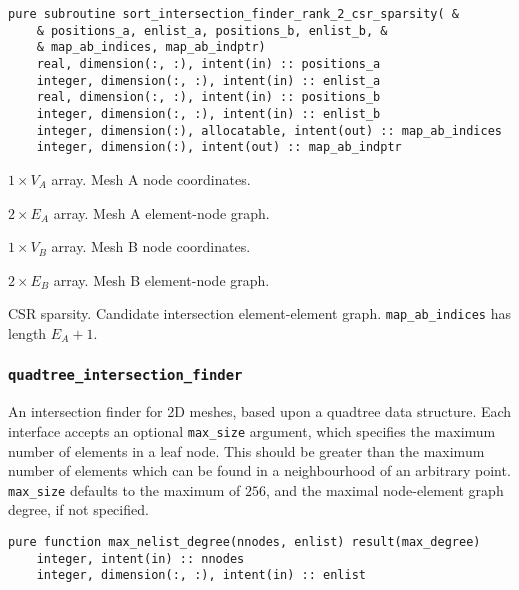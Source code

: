 \documentclass{article}
\begin{document}
\begin{lstlisting}[language=FORTRAN]
  pure subroutine sort_intersection_finder_rank_2_csr_sparsity( &
    & positions_a, enlist_a, positions_b, enlist_b, &
    & map_ab_indices, map_ab_indptr)
    real, dimension(:, :), intent(in) :: positions_a
    integer, dimension(:, :), intent(in) :: enlist_a
    real, dimension(:, :), intent(in) :: positions_b
    integer, dimension(:, :), intent(in) :: enlist_b
    integer, dimension(:), allocatable, intent(out) :: map_ab_indices
    integer, dimension(:), intent(out) :: map_ab_indptr
\end{lstlisting}

\begin{description}[font=\ttfamily\bfseries,leftmargin=2.2\parindent,labelindent=1.7\parindent,noitemsep]
  \item[positions\_a] $1 \times V_A$ array. Mesh A node coordinates.
  \item[enlist\_a] $2 \times E_A$ array. Mesh A element-node graph.
  \item[positions\_b] $1 \times V_B$ array. Mesh B node coordinates.
  \item[enlist\_b] $2 \times E_B$ array. Mesh B element-node graph.
  \item[map\_ab\_indices, map\_ab\_indptr] CSR sparsity. Candidate intersection
    element-element graph. \linebreak \verb+map_ab_indices+ has length 
    $E_A + 1$.
\end{description}

\subsubsection{\texttt{quadtree\_intersection\_finder}}\label{sect:quadtree_global}

An intersection finder for 2D meshes, based upon a quadtree data structure. Each
interface accepts an optional \verb+max_size+ argument, which specifies the
maximum number of elements in a leaf node. This should be greater than the
maximum number of elements which can be found in a neighbourhood of an arbitrary
point. \verb+max_size+ defaults to the maximum of $256$, and the maximal
node-element graph degree, if not specified.

\begin{lstlisting}[language=FORTRAN]  
  pure function max_nelist_degree(nnodes, enlist) result(max_degree)
    integer, intent(in) :: nnodes
    integer, dimension(:, :), intent(in) :: enlist
\end{lstlisting}
\end{document}
